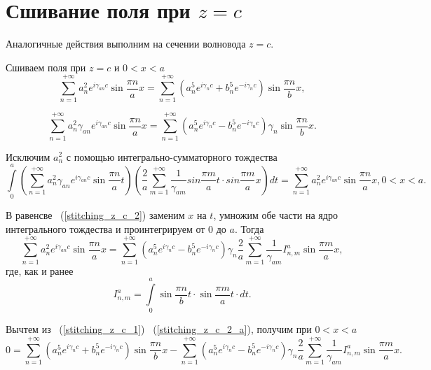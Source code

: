 \section{Сшивание поля при $z=c$}

Аналогичные действия выполним на сечении волновода $z = c$.

Сшиваем поля при $z = c$ и $0 < x < a$
\begin{equation}
	\label{stitching_z_c_1}
	\sum\limits_{n=1}^{+\infty}a_n^2e^{i\gamma_{an}c}\sin{\frac{\pi n}{a}x} = \sum\limits_{n=1}^{+\infty}\left(a_n^5e^{i\gamma_{n}c}+b_n^5e^{-i\gamma_{n}c}\right)\sin{\frac{\pi n}{b}x},
\end{equation}

\begin{equation}
	\label{stitching_z_c_2}
	\sum\limits_{n=1}^{+\infty}a_n^2\gamma_{an}e^{i\gamma_{an}c}\sin{\frac{\pi n}{a}x} = \sum\limits_{n=1}^{+\infty}\left(a_n^5e^{i\gamma_{n}c}-b_n^5e^{-i\gamma_{n}c}\right)\gamma_{n}\sin{\frac{\pi n}{b}x}.
\end{equation}

Исключим $a_n^2$ с помощью интегрально-сумматорного тождества
$$
	\int\limits_0^a\left(\sum\limits_{n=1}^{+\infty}a_n^2\gamma_{an}e^{i\gamma_{an}c}\sin{\frac{\pi n}{a}t}\right)\left(\frac{2}{a}\sum\limits_{m=1}^{+\infty}\frac{1}{\gamma_{am}}sin{\frac{\pi m}{a}t} \cdot sin{\frac{\pi m}{a}x}\right)dt = \sum\limits_{n=1}^{+\infty}a_n^2e^{i\gamma_{an}c}\sin{\frac{\pi n}{a}x}, 0 < x < a.
$$

В равенсве ~(\ref{stitching_z_c_2}) заменим $x$ на $t$, умножим обе части на ядро интегрального тождества и проинтегрируем от $0$ до $a$. Тогда
\begin{equation}
	\label{stitching_z_c_2_a}
	\sum\limits_{n=1}^{+\infty}a_n^2e^{i\gamma_{an}c}\sin{\frac{\pi n}{a}x} = \sum\limits_{n=1}^{+\infty}\left(a_n^5e^{i\gamma_{n}c}-b_n^5e^{-i\gamma_{n}c}\right)\gamma_{n}\frac{2}{a}\sum\limits_{m=1}^{+\infty}\frac{1}{\gamma_{am}}I_{n,m}^a\sin{\frac{\pi m}{a}x},
\end{equation}
где, как и ранее
$$
	I_{n,m}^a = \int\limits_0^a\sin{\frac{\pi n}{b}t} \cdot \sin{\frac{\pi m}{a}t} \cdot dt.
$$

Вычтем из ~(\ref{stitching_z_c_1}) ~(\ref{stitching_z_c_2_a}), получим при $0 < x < a$
\begin{equation}
	\label{stitching_z_c_3}
	0 = \sum\limits_{n=1}^{+\infty}\left(a_n^5e^{i\gamma_{n}c}+b_n^5e^{-i\gamma_{n}c}\right)\sin{\frac{\pi n}{b}x} - \sum\limits_{n=1}^{+\infty}\left(a_n^5e^{i\gamma_{n}c}-b_n^5e^{-i\gamma_{n}c}\right)\gamma_{n}\frac{2}{a}\sum\limits_{m=1}^{+\infty}\frac{1}{\gamma_{am}}I_{n,m}^a\sin{\frac{\pi m}{a}x}.
\end{equation}

